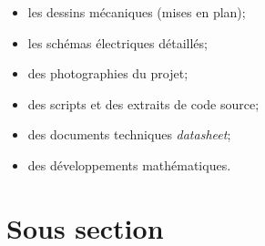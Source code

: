 \documentclass[
    reds, %
    il, %
]{heig-tb}
\let\cleardoublepage=\clearpage
\begin{document}
\begin{itemize}
    \item les dessins mécaniques (mises en plan);
    \item les schémas électriques détaillés;
    \item des photographies du projet;
    \item des scripts et des extraits de code source;
    \item des documents techniques \pex \emph{datasheet};
    \item des développements mathématiques.
\end{itemize}
\section{Sous section}
\lipsum[1]

\let\cleardoublepage\clearpage
\backmatter

\label{glossaire}
\printnoidxglossary
\label{index}
\printindex


\end{document}
